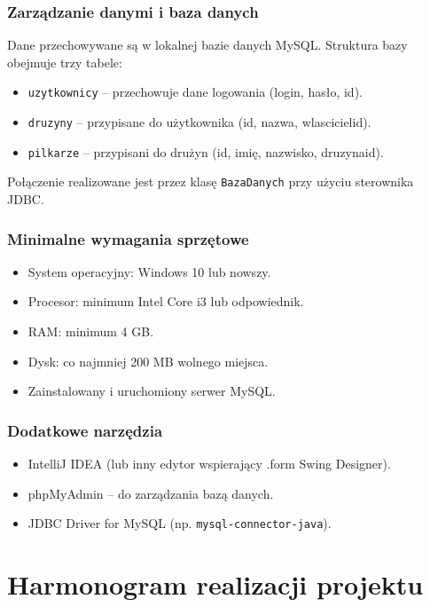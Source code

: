 \documentclass{urdpl}     %
\begin{document}
\subsection{Zarządzanie danymi i baza danych}

Dane przechowywane są w lokalnej bazie danych MySQL. Struktura bazy obejmuje  trzy tabele:
\begin{itemize}
  \item \texttt{uzytkownicy} – przechowuje dane logowania (login, hasło, id).
  \item \texttt{druzyny} – przypisane do użytkownika (id, nazwa, wlascicielid).
  \item \texttt{pilkarze} – przypisani do drużyn (id, imię, nazwisko, druzynaid).
\end{itemize}

Połączenie realizowane jest przez klasę \texttt{BazaDanych} przy użyciu sterownika JDBC.

\subsection{Minimalne wymagania sprzętowe}

\begin{itemize}
  \item System operacyjny: Windows 10 lub nowszy.
  \item Procesor: minimum Intel Core i3 lub odpowiednik.
  \item RAM: minimum 4 GB.
  \item Dysk: co najmniej 200 MB wolnego miejsca.
  \item Zainstalowany i uruchomiony serwer MySQL.
\end{itemize}

\subsection{Dodatkowe narzędzia}

\begin{itemize}
  \item IntelliJ IDEA (lub inny edytor wspierający .form Swing Designer).
  \item phpMyAdmin – do zarządzania bazą danych.
  \item JDBC Driver for MySQL (np. \texttt{mysql-connector-java}).
\end{itemize}

\chapter{Harmonogram realizacji projektu}\label{0}
\end{document}
